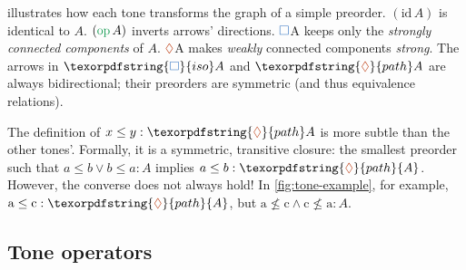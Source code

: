 \documentclass{rntz}
\newcommand{\N}{\mathbb{N}}
\newcommand\opcolor{\color{ForestGreen}}
\newcommand\isocolor{\color{NavyBlue}}
\newcommand\pathcolor{\color{Bittersweet}}
\newcommand\id{\ensuremath{\mathrm{id}}}
\newcommand\op{\ensuremath{\mathrm{\opcolor op}}}
\newcommand\iso{\texorpdfstring{\ensuremath{{\isocolor\Box}}}{iso}}
\renewcommand\path{\texorpdfstring{\ensuremath{{\pathcolor\lozenge}}}{path}}
\newcommand\idof{\id\,}
\newcommand\opof{\op\,}
\newcommand\isof{\iso}
\newcommand\pathof{\path}
\begin{document}
 illustrates how each tone transforms the graph of a
simple preorder. $(\idof A)$ is identical to $A$. $(\opof A)$ inverts arrows'
directions. \isof{A} keeps only the \emph{strongly connected components} of $A$.
\pathof{A} makes \emph{weakly} connected components \emph{strong}. The arrows in
$\isof A$ and $\pathof A$ are always bidirectional; their preorders are
symmetric (and thus equivalence relations).

The definition of $x \le y : \pathof A$ is more subtle than the other tones'.
%
Formally, it is a symmetric, transitive closure: the smallest preorder such that
\(a \le b \vee b \le a : A\) implies \(a \le b : \pathof{A}\). However, the
converse does not always hold! In \cref{fig:tone-example}, for example,
$\text{a} \le \text{c} : \pathof{A}$, but $\text{a} \not\le \text{c}
\wedge \text{c} \not\le \text{a} : A$.






\subsection{Tone operators}
\end{document}
